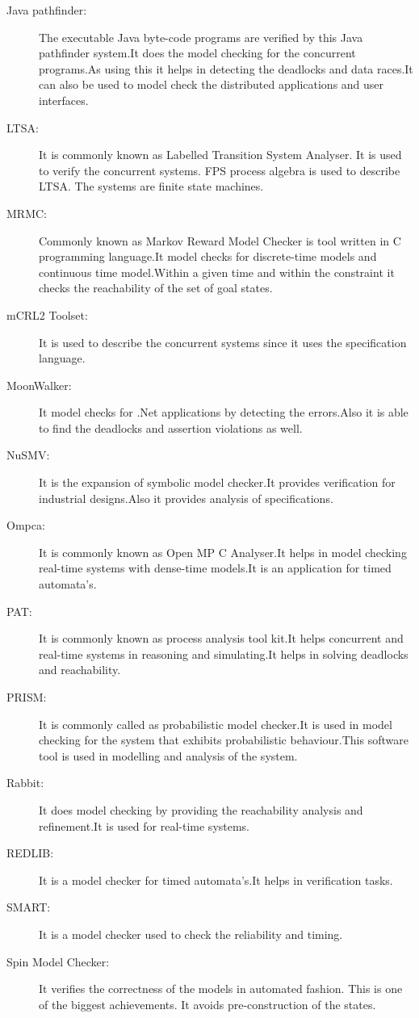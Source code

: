 \documentclass[a4paper,12pt]{extarticle}
\begin{document}
{\begin{description}
\item[Java pathfinder:]The executable Java byte-code programs are verified by this Java pathfinder system.It does the model checking for the concurrent programs.As using this it helps in detecting the deadlocks and data races.It can also be used to model check the distributed applications and user interfaces.
\item[LTSA:] It is commonly known as Labelled Transition System Analyser. It is used to verify the concurrent systems. FPS process algebra is used to describe LTSA. The systems are finite state machines.
\item[MRMC:] Commonly known as Markov Reward Model Checker is tool written in C programming language.It model checks for discrete-time models and continuous time model.Within a given time and within the constraint it checks the reachability of the set of goal states.
\item[mCRL2 Toolset:]It is used to describe the concurrent systems since it uses the specification language.
\item[MoonWalker:]It model checks for .Net applications by detecting the errors.Also it is able to find the deadlocks and assertion violations as well.
\item[NuSMV:] It is the expansion of  symbolic model checker.It provides verification for industrial designs.Also it provides analysis of specifications.\cite{McMillan1992}
\item[Ompca:]It is commonly known as Open MP C Analyser.It helps in model checking  real-time systems with dense-time models.It is an application for timed automata’s.
\item[PAT:]It is commonly known as process analysis tool kit.It helps concurrent and real-time systems in reasoning and simulating.It helps in solving deadlocks and reachability.
\item[PRISM:]It is commonly called as probabilistic model checker.It is used in model checking for the system that exhibits probabilistic behaviour.This software tool is used in modelling and analysis of the system.
\item[Rabbit:]It does model checking by providing the reachability analysis and refinement.It is used for real-time systems.
\item[REDLIB:] It is a model checker for timed automata’s.It helps in verification tasks.
\item[SMART:] It is a model checker used to check the reliability and timing.
\item[Spin Model Checker:]It verifies the correctness of the models in automated fashion. This is one of the biggest achievements. It avoids pre-construction of the states.

\end{description}}
\end{document}
